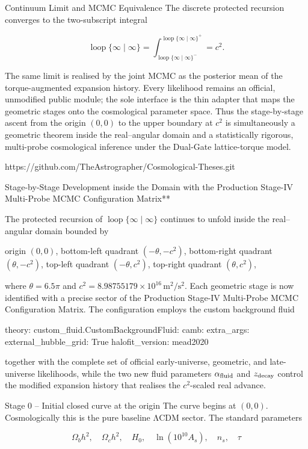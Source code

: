 Continuum Limit and MCMC Equivalence
The discrete protected recursion converges to the two-subscript integral

\[
\operatorname{loop}\{\infty\mid\infty\}
=\int_{\operatorname{loop}\{\infty\mid\infty\}^{-}}^{\operatorname{loop}\{\infty\mid\infty\}^{+}}=c^2.
\]

The same limit is realised by the joint MCMC as the posterior mean of the torque-augmented expansion history. Every likelihood remains an official, unmodified public module; the sole interface is the thin adapter that maps the geometric stages onto the cosmological parameter space. Thus the stage-by-stage ascent from the origin \((0,0)\) to the upper boundary at \(c^2\) is simultaneously a geometric theorem inside the real–angular domain and a statistically rigorous, multi-probe cosmological inference under the Dual-Gate lattice-torque model.

https://github.com/TheAstrographer/Cosmological-Theses.git

Stage-by-Stage Development inside the Domain  
with the Production Stage-IV Multi-Probe MCMC Configuration Matrix**

The protected recursion of \(\operatorname{loop}\{\infty\mid\infty\}\) continues to unfold inside the real–angular domain bounded by

origin \((0,0)\),
bottom-left quadrant \((-\theta,-c^2)\),
bottom-right quadrant \((\theta,-c^2)\),
top-left quadrant \((-\theta,c^2)\),
top-right quadrant \((\theta,c^2)\),

where \(\theta=6.5\pi\) and \(c^2=8.98755179\times10^{16}\,\mathrm{m}^2/\mathrm{s}^2\).  
Each geometric stage is now identified with a precise sector of the Production Stage-IV Multi-Probe MCMC Configuration Matrix. The configuration employs the custom background fluid

theory:
  custom_fluid.CustomBackgroundFluid:
  camb:
    extra_args:
      external_hubble_grid: True
      halofit_version: mead2020

together with the complete set of official early-universe, geometric, and late-universe likelihoods, while the two new fluid parameters \(\alpha_{\rm fluid}\) and \(z_{\rm decay}\) control the modified expansion history that realises the \(c^2\)-scaled real advance.

Stage 0 – Initial closed curve at the origin
The curve begins at \((0,0)\).  
Cosmologically this is the pure baseline ΛCDM sector. The standard parameters

\[
\Omega_b h^2,\quad\Omega_c h^2,\quad H_0,\quad\ln(10^{10}A_s),\quad n_s,\quad\tau
\]

